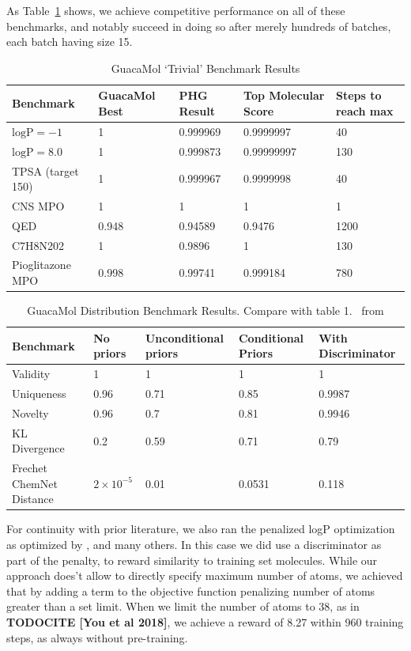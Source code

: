 \documentclass{article}
\newcommand{\CITE}[1]{{\bf TODOCITE [#1]}}
\begin{document}
As Table~\ref{tab:guac-trivial} shows, we achieve competitive performance on all of these benchmarks, and notably succeed in doing so after merely hundreds of batches, each batch having size 15.

\begin{table}
    \caption{GuacaMol `Trivial' Benchmark Results}
    \label{tab:guac-trivial}
    \centering
    \begin{tabular}{lllll}
        \toprule
        Benchmark & GuacaMol Best & PHG Result & Top Molecular Score & Steps to reach max \\
        \midrule
        $\text{logP} = -1$ & 1 & 0.999969 & 0.9999997 & 40 \\
        $\text{logP} = 8.0$ & 1 & 0.999873 & 0.99999997 & 130 \\
        TPSA (target 150) & 1 & 0.999967 & 0.9999998 & 40 \\
        CNS MPO & 1 & 1 & 1 & 1 \\
        QED & 0.948 & 0.94589 & 0.9476 & 1200 \\
        C7H8N202 & 1 & 0.9896 & 1 & 130 \\
        Pioglitazone MPO & 0.998 & 0.99741 & 0.999184 & 780 \\
        \bottomrule
    \end{tabular}
\end{table}

\begin{table}
    \caption{GuacaMol Distribution Benchmark Results. Compare with table 1.~ from \cite{brown2019}}
    \label{tab:guac-dist}
    \centering
    \begin{tabular}{lllll}
        \toprule
        Benchmark & No priors & Unconditional priors & Conditional Priors & With Discriminator \\
        \midrule
        Validity & 1 & 1 & 1 & 1 \\
        Uniqueness & 0.96 & 0.71 & 0.85 & 0.9987 \\
        Novelty & 0.96 & 0.7 & 0.81 & 0.9946 \\
        KL Divergence & 0.2 & 0.59 & 0.71 & 0.79 \\
        Frechet ChemNet Distance & $2 \times 10^{-5}$ & 0.01 & 0.0531 & 0.118 \\
        \bottomrule
    \end{tabular}
\end{table}

For continuity with prior literature, we also ran the penalized logP optimization as optimized by \cite{kusner2017, you2018}, and many others. In this case we did use a discriminator as part of the penalty, to reward similarity to training set molecules. While our approach does't allow to directly specify maximum number of atoms, we achieved that by adding a term to the objective function penalizing number of atoms greater than a set limit. When we limit the number of atoms to 38, as in \CITE{You et al 2018}, we achieve a reward of 8.27 within 960 training steps, as always without pre-training. 
\end{document}
